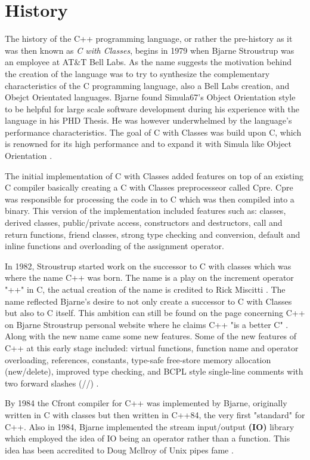 \documentclass[conference, a4paper]{IEEEtran}
\begin{document}
\section{History}
The history of the C++ programming language, or rather the pre-history as it was then known as \textit{C with Classes}, begins in 1979 when Bjarne Stroustrup was an employee at AT\&T Bell Labs. As the name suggests the motivation behind the creation of the language was to try to synthesize the complementary characteristics of the C programming language, also a Bell Labs creation, and Obejct Orientated languages. Bjarne found Simula67's Object Orientation style to be helpful for large scale software development during his experience with the language in his PHD Thesis. He was however underwhelmed by the language's performance characteristics. The goal of C with Classes was build upon C, which is renowned for its high performance and to expand it with Simula like Object Orientation \cite{cppevolving}.

The initial implementation of C with Classes added features on top of an existing C compiler basically creating a C with Classes preprocesseor called Cpre. Cpre was responsible for processing the code in to C which was then compiled into a binary. This version of the implementation included features such as: classes, derived classes, public/private access, constructors and destructors, call and return functions, friend classes, strong type checking and conversion, default and inline functions and overloading of the assignment operator. 

In 1982, Stroustrup started work on the successor to C with classes which was where the name C++ was born. The name is a play on the increment operator "++" in C, the actual creation of the name is credited to Rick Miscitti \cite{cpphistory}. The name reflected Bjarne's desire to not only create a successor to C with Classes but also to C itself. This ambition can still be found on the page concerning C++ on Bjarne Stroustrup personal website where he claims C++ "is a better C" \cite{cpphome}. Along with the new name came some new features. Some of the new features of C++ at this early stage included: virtual functions, function name and operator overloading, references, constants, type-safe free-store memory allocation (new/delete), improved type checking, and BCPL style single-line comments with two forward slashes (//) \cite{cpphistory}. 

By 1984 the Cfront compiler for C++ was implemented by Bjarne, originally written in C with classes but then written in C++84, the very first "standard" for C++. Also in 1984, Bjarne implemented the stream input/output \textbf{(IO)} library which employed the idea of IO being an operator rather than a function. This idea has been accredited to Doug Mcllroy of Unix pipes fame \cite{cpphistory}. 
\end{document}
